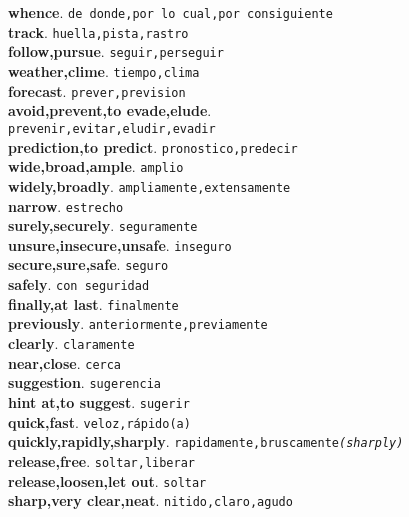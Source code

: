 \documentclass[twocolumn]{article}
\begin{document}
	\textsf{\textbf{whence}}. \texttt{de donde,por lo cual,por consiguiente}\\
	\textsf{\textbf{track}}. \texttt{huella,pista,rastro}\\
	\textsf{\textbf{follow,pursue}}. \texttt{seguir,perseguir}\\
	\textsf{\textbf{weather,clime}}. \texttt{tiempo,clima}\\
	\textsf{\textbf{forecast}}. \texttt{prever,prevision}\\
	\textsf{\textbf{avoid,prevent,to evade,elude}}.\\\texttt{prevenir,evitar,eludir,evadir}\\
	\textsf{\textbf{prediction,to predict}}. \texttt{pronostico,predecir}\\
	\textsf{\textbf{wide,broad,ample}}. \texttt{amplio}\\
	\textsf{\textbf{widely,broadly}}. \texttt{ampliamente,extensamente}\\
	\textsf{\textbf{narrow}}. \texttt{estrecho}\\
	\textsf{\textbf{surely,securely}}. \texttt{seguramente}\\
	\textsf{\textbf{unsure,insecure,unsafe}}. \texttt{inseguro}\\
	\textsf{\textbf{secure,sure,safe}}. \texttt{seguro}\\
	\textsf{\textbf{safely}}. \texttt{con seguridad}\\
	\textsf{\textbf{finally,at last}}. \texttt{finalmente}\\
	\textsf{\textbf{previously}}. \texttt{anteriormente,previamente}\\
	\textsf{\textbf{clearly}}. \texttt{claramente}\\
	\textsf{\textbf{near,close}}. \texttt{cerca}\\
	\textsf{\textbf{suggestion}}. \texttt{sugerencia}\\
	\textsf{\textbf{hint at,to suggest}}. \texttt{sugerir}\\
	\textsf{\textbf{quick,fast}}. \texttt{veloz,r\'apido(a)}\\
	\textsf{\textbf{quickly,rapidly,sharply}}. \texttt{rapidamente,bruscamente{\scriptsize \textsl{(sharply)}}}\\
	\textsf{\textbf{release,free}}. \texttt{soltar,liberar}\\
	\textsf{\textbf{release,loosen,let out}}. \texttt{soltar}\\
	\textsf{\textbf{sharp,very clear,neat}}. \texttt{nitido,claro,agudo}\\
\end{document}
